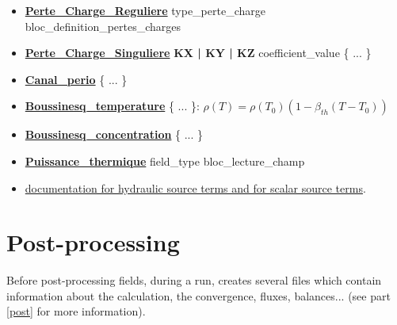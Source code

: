 \begin{itemize}
\item \href{\REFERENCEMANUAL\#pertechargereguliere}{\textbf{Perte\_Charge\_Reguliere}} type\_perte\_charge bloc\_definition\_pertes\_charges
\item \href{\REFERENCEMANUAL\#pertechargesinguliere}{\textbf{Perte\_Charge\_Singuliere}} \textbf{KX | KY | KZ} coefficient\_value \{ ... \} 
\item \href{\REFERENCEMANUAL\#canalperio}{\textbf{Canal\_perio}} \{ ... \} 
\item \href{\REFERENCEMANUAL\#boussinesqtemperature}{\textbf{Boussinesq\_temperature}} \{ ... \}: $\rho(T)=\rho(T_0)(1-\beta_{th}(T-T_0))$
\item \href{\REFERENCEMANUAL\#boussinesqconcentration}{\textbf{Boussinesq\_concentration}} \{ ... \}
\item \href{\REFERENCEMANUAL\#puissancethermique}{\textbf{Puissance\_thermique}} field\_type   bloc\_lecture\_champ 
\item \href{\REFERENCEMANUAL\#sourcebase}{documentation for hydraulic source terms and for scalar source terms}.
\end{itemize}





\section{Post-processing}

Before post-processing fields, during a run, \trust creates several files which contain information about the calculation, the convergence, fluxes, balances... (see part \ref{post} for more information).\\

